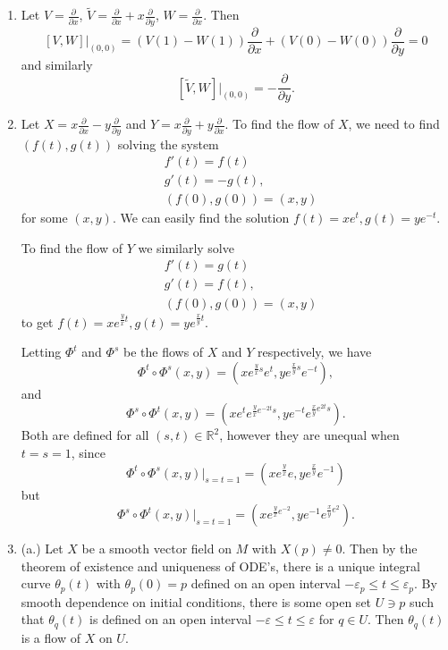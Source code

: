 \documentclass[11pt, reqno]{article}
\theoremstyle{plain}
\theoremstyle{definition}
\theoremstyle{remark}
\renewcommand{\epsilon}{\varepsilon}
\newcommand{\RR}{\mathbb{R}}
\begin{document}
\begin{enumerate}
    and moreover
    \[
        \text{Ad}(F^{-1})(XY) = (\hat{F})^{-1}(XY)\circ\hat{F} = (\hat{F})^{-1}\circ \hat{F}\circ (\hat{F})^{-1}\circ Y \circ \hat{F}
        = \text{Ad}(F)X\circ \text{Ad}(F^{-1})Y = F_* X F_* Y.
    \]
    Thus $F_*[X, Y] = [F_* X, F_* Y]$.

    \item[2.] Let $V = \frac{\partial}{\partial x}$, $\tilde{V} = \frac{\partial}{\partial x} + x \frac{\partial}{\partial y}$, $W = 
    \frac{\partial}{\partial x}$. Then
    \[
        [V, W]|_{(0,0)} = (V(1) - W(1))\frac{\partial}{\partial x} + (V(0) - W(0))\frac{\partial}{\partial y} = 0
    \]
    and similarly
    \[  
        [\tilde{V}, W]|_{(0,0)} = -\frac{\partial}{\partial y}.
    \]

    \item[3.] Let $X = x \frac{\partial}{\partial x} - y \frac{\partial}{\partial y}$ and $Y = x \frac{\partial}{\partial y} + 
    y \frac{\partial}{\partial x}$. To find the flow of $X$, we need to find $(f(t), g(t))$ solving the system
    \begin{align*}
        & f'(t) = f(t)\\
        & g'(t) = -g(t),\\
        & (f(0), g(0)) = (x,y)
    \end{align*}
    for some $(x,y)$.
    We can easily find the solution $f(t) = xe^t, g(t) = ye^{-t}$. 

    To find the flow of $Y$ we similarly solve
    \begin{align*}
        & f'(t) = g(t)\\
        & g'(t) = f(t),\\
        & (f(0), g(0)) = (x,y)
    \end{align*}
    to get $f(t) = xe^{\frac{y}{x}t}, g(t) = ye^{\frac{x}{y}t}$.

    Letting $\Phi^t$ and $\Phi^s$ be the flows of $X$ and $Y$ respectively, we have
    \[
        \Phi^t \circ \Phi^s(x,y) = (xe^{\frac{y}{x}s}e^t, ye^{\frac{x}{y}s}e^{-t}),
    \]
    and
    \[
        \Phi^s \circ \Phi^t(x,y) = (xe^t e^{\frac{y}{x}e^{-2t}s}, ye^{-t}e^{\frac{x}{y}e^{2t}s}).
    \]
    Both are defined for all $(s,t) \in \RR^2$, however they are unequal when $t = s = 1$, since
    \[
        \Phi^t \circ \Phi^s(x,y)|_{s = t = 1} = (xe^{\frac{y}{x}}e, ye^{\frac{x}{y}}e^{-1})
    \]
    but
    \[
        \Phi^s \circ \Phi^t(x,y)|_{s = t = 1} = (xe^{\frac{y}{x}e^{-2}}, ye^{-1}e^{\frac{x}{y}e^2}).
    \]

    \item[4.] (a.) Let $X$ be a smooth vector field on $M$ with $X(p) \neq 0$. Then by the theorem of existence
    and uniqueness of ODE's, there is a unique integral curve $\theta_p(t)$ with $\theta_p(0) = p$ defined on an open interval 
    $-\epsilon_p \leq t \leq \epsilon_p$. By smooth dependence on initial conditions, there is some open 
    set $U \ni p$ such that $\theta_q(t)$ is defined on an open interval $-\epsilon \leq t \leq \epsilon$
    for $q \in U$. Then $\theta_q(t)$ is a flow of $X$ on $U$. 


\end{enumerate}
\end{document}

